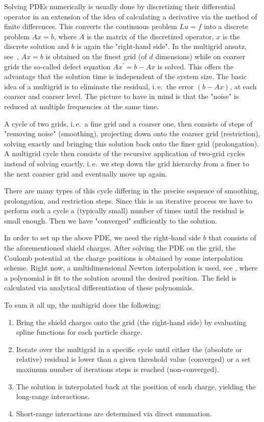 Solving PDEs numerically is usually done by discretizing their differential operator in an extension of the idea of calculating a derivative via the method of finite differences. This converts the continuous problem $Lu=f$ into a discrete problem $Ax=b$, where $A$ is the matrix of the discretized operator, $x$ is the discrete solution and $b$ is again the "right-hand side". In the multigrid ansatz, see~, $Ax=b$ is obtained on the finest grid (of $d$ dimensions) while on coarser grids the so-called defect equation $Ax^\prime=b-Ax$ is solved. This offers the advantage that the solution time is independent of the system size. The basic idea of a multigrid is to eliminate the residual, i.\,e.~the error $(b-Ax)$, at each coarser and coarser level. The picture to have in mind is that the "noise" is reduced at multiple frequencies at the same time. 

A cycle of two grids, i.\,e.~a fine grid and a coarser one, then consists of steps of "removing noise" (smoothing), projecting down onto the coarser grid (restriction), solving exactly and bringing this solution back onto the finer grid (prolongation). A multigrid cycle then consists of the recursive application of two-grid cycles instead of solving exactly, i.\,e.~we step down the grid hierarchy from a finer to the next coarser grid and eventually move up again.

There are many types of this cycle differing in the precise sequence of smoothing, prolongation, and restriction steps. Since this is an iterative process we have to perform such a cycle a (typically small) number of times until the residual is small enough. Then we have "converged" sufficiently to the solution.

In order to set up the above PDE, we need the right-hand side $b$ that consists of the aforementioned shield charges. After solving the PDE on the grid, the Coulomb potential at the charge positions is obtained by some interpolation scheme. Right now, a multidimensional Newton interpolation is used, see , where a polynomial is fit to the solution around the desired position. The field is calculated via analytical differentiation of these polynomials.

To sum it all up, the multigrid does the following:
\begin{enumerate}
 \item Bring the shield charges onto the grid (the right-hand side) by evaluating spline functions for each particle charge.
 \item Iterate over the multigrid in a specific cycle until either the (absolute or relative) residual is lower than a given threshold value (converged) or a set maximum number of iterations steps is reached (non-converged).
 \item The solution is interpolated back at the position of each charge, yielding the long-range interactions.
 \item Short-range interactions are determined via direct summation.
\end{enumerate}

